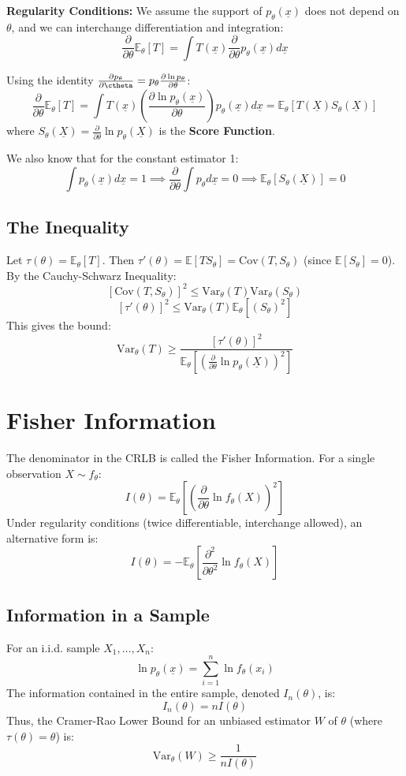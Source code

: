 \documentclass[12pt, a4paper]{article}
\theoremstyle{definition}
\newcommand{\E}{\mathbb{E}}
\newcommand{\Var}{\text{Var}}
\newcommand{\xvec}{\underline{x}}
\newcommand{\Xvec}{\underline{X}}
\begin{document}
\textbf{Regularity Conditions:}
We assume the support of $p_\theta(\xvec)$ does not depend on $\theta$, and we can interchange differentiation and integration:
$$ \frac{\partial}{\partial \theta} \E_\theta[T] = \int T(\xvec) \frac{\partial}{\partial \theta} p_\theta(\xvec) d\xvec $$

Using the identity $\frac{\partial p_\theta}{\partial \ctheta} = p_\theta \frac{\partial \ln p_\theta}{\partial \theta}$:
$$ \frac{\partial}{\partial \theta} \E_\theta[T] = \int T(\xvec) \left( \frac{\partial \ln p_\theta(\xvec)}{\partial \theta} \right) p_\theta(\xvec) d\xvec = \E_\theta\left[ T(\Xvec) S_\theta(\Xvec) \right] $$
where $S_\theta(\Xvec) = \frac{\partial}{\partial \theta} \ln p_\theta(\Xvec)$ is the \textbf{Score Function}.

We also know that for the constant estimator 1:
$$ \int p_\theta(\xvec) d\xvec = 1 \implies \frac{\partial}{\partial \theta} \int p_\theta d\xvec = 0 \implies \E_\theta[S_\theta(\Xvec)] = 0 $$

\subsection{The Inequality}
Let $\tau(\theta) = \E_\theta[T]$. Then $\tau'(\theta) = \E[T S_\theta] = \text{Cov}(T, S_\theta)$ (since $\E[S_\theta]=0$).
By the Cauchy-Schwarz Inequality:
$$ [\text{Cov}(T, S_\theta)]^2 \le \Var_\theta(T) \Var_\theta(S_\theta) $$
$$ [\tau'(\theta)]^2 \le \Var_\theta(T) \E_\theta[(S_\theta)^2] $$
This gives the bound:
$$ \Var_\theta(T) \ge \frac{[\tau'(\theta)]^2}{\E_\theta[(\frac{\partial}{\partial \theta} \ln p_\theta(\Xvec))^2]} $$

\section{Fisher Information}

The denominator in the CRLB is called the Fisher Information.
For a single observation $X \sim f_\theta$:
$$ I(\theta) = \E_\theta\left[ \left( \frac{\partial}{\partial \theta} \ln f_\theta(X) \right)^2 \right] $$
Under regularity conditions (twice differentiable, interchange allowed), an alternative form is:
$$ I(\theta) = -\E_\theta\left[ \frac{\partial^2}{\partial \theta^2} \ln f_\theta(X) \right] $$

\subsection{Information in a Sample}
For an i.i.d. sample $X_1, \dots, X_n$:
$$ \ln p_\theta(\xvec) = \sum_{i=1}^n \ln f_\theta(x_i) $$
The information contained in the entire sample, denoted $I_n(\theta)$, is:
$$ I_n(\theta) = n I(\theta) $$
Thus, the Cramer-Rao Lower Bound for an unbiased estimator $W$ of $\theta$ (where $\tau(\theta)=\theta$) is:
$$ \Var_\theta(W) \ge \frac{1}{n I(\theta)} $$
\end{document}
